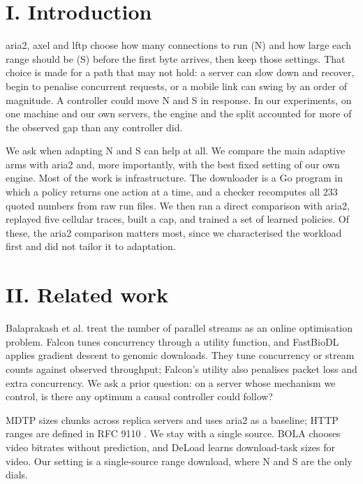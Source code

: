 \documentclass[conference]{IEEEtran}
\begin{document}
\section*{I. Introduction}

aria2, axel and lftp choose how many connections to run (N) and how large each range should be (S) before the first byte arrives, then keep those settings. That choice is made for a path that may not hold: a server can slow down and recover, begin to penalise concurrent requests, or a mobile link can swing by an order of magnitude. A controller could move N and S in response. In our experiments, on one machine and our own servers, the engine and the split accounted for more of the observed gap than any controller did.


We ask when adapting N and S can help at all. We compare the main adaptive arms with aria2 and, more importantly, with the best fixed setting of our own engine. Most of the work is infrastructure. The downloader is a Go program in which a policy returns one action at a time, and a checker recomputes all 233 quoted numbers from raw run files. We then ran a direct comparison with aria2, replayed five cellular traces, built a cap, and trained a set of learned policies. Of these, the aria2 comparison matters most, since we characterised the workload first and did not tailor it to adaptation.


\section*{II. Related work}

Balaprakash et al. \cite{balaprakash2016direct} treat the number of parallel streams as an online optimisation problem. Falcon \cite{arifuzzaman2021online,arifuzzaman2023falcon} tunes concurrency through a utility function, and FastBioDL \cite{swargo2025fastbiodl} applies gradient descent to genomic downloads. They tune concurrency or stream counts against observed throughput; Falcon's utility also penalises packet loss and extra concurrency. We ask a prior question: on a server whose mechanism we control, is there any optimum a causal controller could follow?


MDTP \cite{abdollah2025mdtp} sizes chunks across replica servers and uses aria2 \cite{aria2manual} as a baseline; HTTP ranges are defined in RFC 9110 \cite{rfc9110}. We stay with a single source. BOLA \cite{spiteri2020bola} chooses video bitrates without prediction, and DeLoad \cite{liu2025deload} learns download-task sizes for video. Our setting is a single-source range download, where N and S are the only dials.
\end{document}
